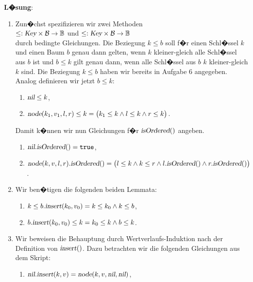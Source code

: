 \documentclass{article}
\begin{document}
\noindent
\textbf{L�sung}:
\begin{enumerate}
\item Zun�chst spezifizieren wir zwei Methoden
      \\[0.2cm]
      \hspace*{1.3cm} 
      $\leq: \textsl{Key} \times \mathcal{B} \rightarrow \mathbb{B}$ \quad und \quad
      $\leq: \textsl{Key} \times \mathcal{B} \rightarrow \mathbb{B}$
      \\[0.2cm]
      durch bedingte Gleichungen.  Die Beziegung $k \leq b$ soll f�r einen Schl�ssel $k$ und einen Baum
      $b$ genau dann gelten, wenn $k$ kleiner-gleich alle Schl�ssel aus $b$ ist und
      $b \leq k$ gilt genau dann, wenn alle Schl�ssel aus $b$ $k$ kleiner-gleich  $k$ sind.
      Die Beziegung $k \leq b$ haben wir bereits in Aufgabe 6 angegeben.  Analog definieren wir jetzt
      $b \leq k$:
      \begin{enumerate}
      \item $\textsl{nil} \leq k$,
      \item $\textsl{node}(k_1,v_1,l,r) \leq k = \bigl(k_1 \leq k \wedge l \leq k \wedge r \leq k \bigr)$.
      \end{enumerate}
      Damit k�nnen wir nun Gleichungen f�r $\textsl{isOrdered}()$ angeben.
      \begin{enumerate}
      \item $\textsl{nil}.\textsl{isOrdered}() = \mathtt{true}$,
      \item $\textsl{node}(k,v,l,r).\textsl{isOrdered}() = 
             \bigl(l \leq k \wedge k \leq r \wedge l.\textsl{isOrdered}() \wedge r.\textsl{isOrdered}()\bigr)$.
      \end{enumerate}
\item Wir ben�tigen die folgenden beiden Lemmata:
      \begin{enumerate}
      \item $k \leq b.\textsl{insert}(k_0,v_0) = k \leq k_0 \wedge k \leq b$,
      \item $b.\textsl{insert}(k_0,v_0) \leq k = k_0 \leq k \wedge b \leq k$.
      \end{enumerate}
\item Wir beweisen die Behauptung durch Wertverlaufs-Induktion nach der Definition von $\textsl{insert}()$. 
      Dazu betrachten wir die folgenden Gleichungen aus dem Skript:
      \begin{enumerate}
      \item $\textsl{nil}\mathtt{.}\textsl{insert}(k,v) = \textsl{node}(k,v, \textsl{nil}, \textsl{nil})$,

\end{enumerate}
\end{enumerate}
\end{document}
